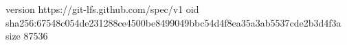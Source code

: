 version https://git-lfs.github.com/spec/v1
oid sha256:67548c054de231288ce4500be8499049bbc54d4f8ea35a3ab5537cde2b3d4f3a
size 87536
